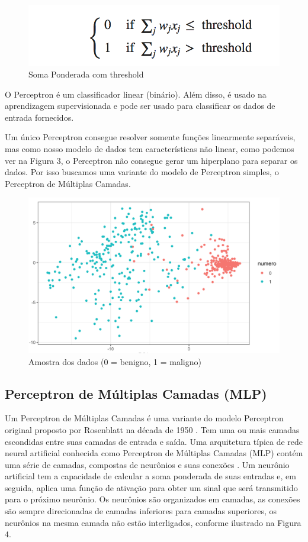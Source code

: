 \documentclass[conference]{IEEEtran}
\begin{document}
	\begin{figure}[htbp]
	\centerline{\includegraphics[scale=0.8]{Perceptron-threshold.png}}
	\caption{Soma Ponderada com threshold}
	\label{fig}
	\end{figure}

    O Perceptron é um classificador linear (binário). Além disso, é usado na aprendizagem supervisionada e pode ser usado para classificar os dados de entrada fornecidos.
    
    Um único Perceptron consegue resolver somente funções linearmente separáveis,  mas como nosso modelo de dados tem características não linear, como podemos ver na Figura 3, o Perceptron não consegue gerar um hiperplano para separar os dados. Por isso buscamos uma variante do modelo de Perceptron simples, o Perceptron de Múltiplas Camadas.
    
    \begin{figure}[htbp]
	\centerline{\includegraphics[scale=0.3]{dados-cancer.png}}
	\caption{Amostra dos dados (0 = benigno, 1 = maligno)}
	\label{fig}
	\end{figure}
    
    \subsection{Perceptron de Múltiplas Camadas (MLP)}
    Um Perceptron de Múltiplas Camadas é uma variante do modelo Perceptron original proposto por Rosenblatt na década de 1950 \cite{b9}. Tem uma ou mais camadas escondidas entre suas camadas de entrada e saída. Uma arquitetura típica de rede neural artificial conhecida como Perceptron de Múltiplas Camadas (MLP) contém uma série de camadas, compostas de neurônios e suas conexões \cite{b14}. Um neurônio artificial tem a capacidade de calcular a soma ponderada de suas entradas e, em seguida, aplica uma função de ativação para obter um sinal que será transmitido para o próximo neurônio. Os neurônios são organizados em camadas, as conexões são sempre direcionadas de camadas inferiores para camadas superiores, os neurônios na mesma camada não estão interligados, conforme ilustrado na Figura 4.
    
\end{document}
